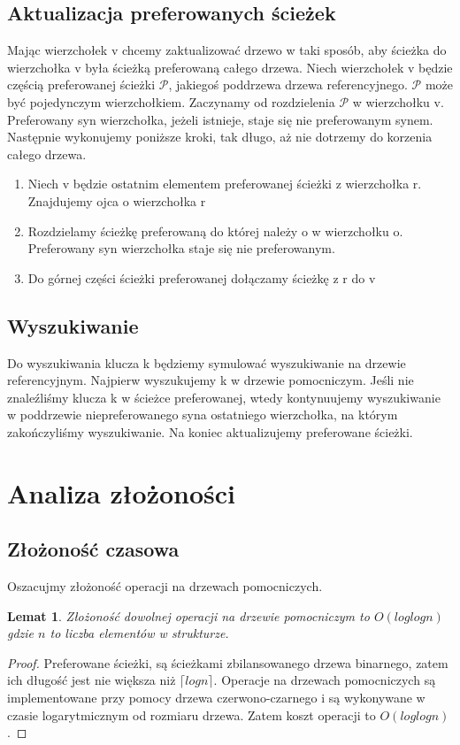 \documentclass[declaration,shortabstract]{iithesis}
\theoremstyle{remark}
\theoremstyle{plain}
\theoremstyle{plain}
\theoremstyle{plain}
\newtheorem{lemma}[definition]{Lemat}
\begin{document}
\subsection{Aktualizacja preferowanych ścieżek}
Mając wierzchołek v chcemy zaktualizować drzewo w taki sposób, aby ścieżka do wierzchołka v była ścieżką preferowaną całego drzewa. Niech wierzchołek v będzie częścią preferowanej ścieżki \(\mathcal{P}\), jakiegoś poddrzewa drzewa referencyjnego. \(\mathcal{P}\) może być pojedynczym wierzchołkiem.
Zaczynamy od rozdzielenia \(\mathcal{P}\) w wierzchołku v. Preferowany syn wierzchołka, jeżeli istnieje, staje się nie preferowanym synem. Następnie wykonujemy poniższe kroki, tak długo, aż nie dotrzemy do korzenia całego drzewa. 
\begin{enumerate}
\item{Niech v będzie ostatnim elementem preferowanej ścieżki z wierzchołka r. Znajdujemy ojca o wierzchołka r}
\item{Rozdzielamy ścieżkę preferowaną do której należy o w wierzchołku o. Preferowany syn wierzchołka staje się nie preferowanym.}
\item{Do górnej części ścieżki preferowanej dołączamy ścieżkę z r do v}
\end{enumerate}
\subsection{Wyszukiwanie}
Do wyszukiwania klucza k będziemy symulować wyszukiwanie na drzewie referencyjnym. Najpierw wyszukujemy k w drzewie pomocniczym. Jeśli nie znaleźliśmy klucza k w ścieżce preferowanej, wtedy kontynuujemy wyszukiwanie w poddrzewie niepreferowanego syna ostatniego wierzchołka, na którym zakończyliśmy wyszukiwanie. Na koniec aktualizujemy preferowane ścieżki.
\section{Analiza złożoności}
\subsection{Złożoność czasowa}
Oszacujmy złożoność operacji na drzewach pomocniczych.
\begin{lemma}
\label{Pref_cost}
Złożoność dowolnej operacji na drzewie pomocniczym to \( O(loglogn)\) gdzie $n$ to liczba elementów w strukturze.
\end{lemma}
\begin{proof}
Preferowane ścieżki, są ścieżkami zbilansowanego drzewa binarnego, zatem ich długość jest nie większa niż \(\lceil log n \rceil\). Operacje na drzewach pomocniczych są implementowane przy pomocy drzewa czerwono-czarnego i są wykonywane w czasie logarytmicznym od rozmiaru drzewa. Zatem koszt operacji to \( O(loglogn)\).
\end{proof}
\end{document}
